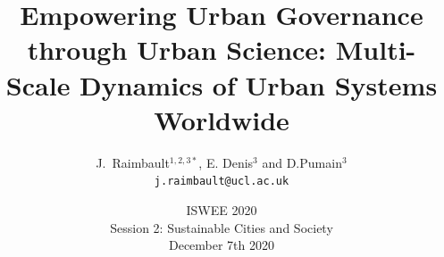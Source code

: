 



\title[Dynamics of Urban Systems]{Empowering Urban Governance through Urban Science: Multi-Scale Dynamics of Urban Systems Worldwide}
\author[Raimbault, Denis and Pumain]{J.~Raimbault$^{1,2,3\ast}$, E. Denis$^3$ and D.Pumain$^3$\\
\texttt{j.raimbault@ucl.ac.uk}
}




\date[December 7th 2020]{ISWEE 2020\\
Session 2: Sustainable Cities and Society\\
December 7th 2020
}

\frame{\maketitle}

% 

